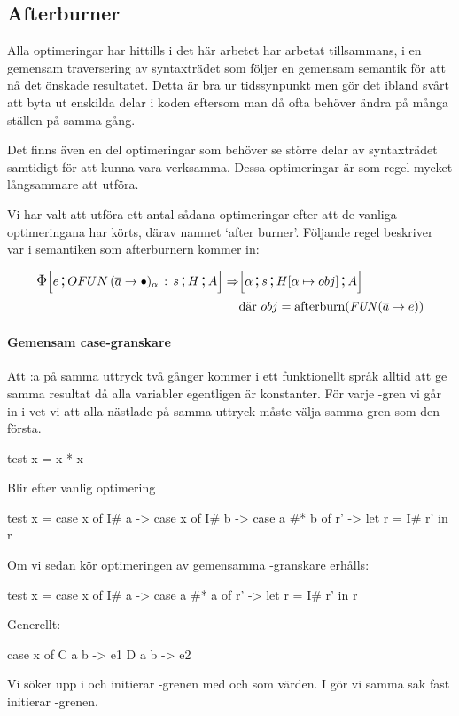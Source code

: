 \documentclass[../Optimise]{subfiles}
\begin{document}
\subsection{Afterburner}

Alla optimeringar har hittills i det här arbetet har arbetat tillsammans, i en gemensam
traversering av syntaxträdet som följer en gemensam semantik för att nå det önskade resultatet. 
Detta är bra ur tidssynpunkt men gör det ibland svårt att byta ut enskilda delar i koden
eftersom man då ofta behöver ändra på många ställen på samma gång.

Det finns även en del optimeringar som behöver se större delar av syntaxträdet
samtidigt för att kunna vara verksamma. Dessa optimeringar är som regel mycket långsammare att utföra.

Vi har valt att utföra ett antal sådana optimeringar efter att de vanliga
optimeringana har körts, därav namnet `after burner'. Följande regel beskriver
var i semantiken som afterburnern kommer in:

\begin{align*}
\CBNIRR{\cOFUN{\many{a}}{\alpha}s}HAe \Rightarrow & \CBNMC{\alpha}{s}{\heap{\alpha}{obj}}A \\
 & \text{där } obj = \text{afterburn} (\FUN{\many{a}}e)
\end{align*}

\paragraph{Gemensam case-granskare} 
Att :a på samma uttryck två gånger kommer i ett funktionellt språk alltid att ge
samma resultat då alla variabler egentligen är konstanter. För varje -gren
vi går in i vet vi att alla nästlade  på samma uttryck måste välja samma
gren som den första.

\begin{codeEx}
test x = x * x
\end{codeEx}

Blir efter vanlig optimering

\begin{codeEx}
test x = case x of
            I# a -> case x of
                I# b -> case a #* b of
                    r' -> let r = I# r'
                            in r
\end{codeEx}

Om vi sedan kör optimeringen av gemensamma -granskare erhålls:
\begin{codeEx}
test x = case x of
            I# a -> case a #* a of
                r' -> let r = I# r'
                    in r
\end{codeEx}

Generellt:
		\begin{codeEx}
case x of
    C a b -> e1
    D a b -> e2
\end{codeEx}

Vi söker upp  i  och initierar 
-grenen med  och  som värden. I  gör vi samma sak fast initierar -grenen.
\end{document}
